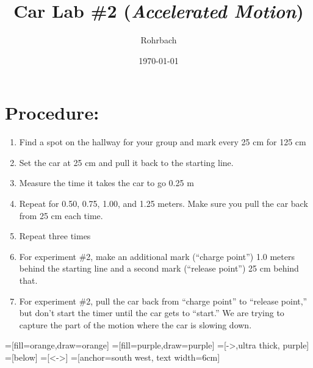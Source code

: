 \documentclass[10pt]{exam}
\title{Car Lab \#2 (\emph{Accelerated Motion})}
\author{Rohrbach}
\date{\today}
\begin{document}
\maketitle

\vspace{-1em}
\section*{Procedure:}
  \begin{enumerate}[label=\alph*),topsep=0pt,itemsep=-1ex,partopsep=1ex,parsep=1ex]
    \item 
      Find a spot on the hallway for your group and mark every 25 cm for 125 cm
    \item 
      Set the car at 25 cm and pull it back to the starting line.
    \item 
      Measure the time it takes the car to go 0.25 m
    \item
      Repeat for 0.50, 0.75, 1.00, and 1.25 meters.  Make sure you pull the car back from 25 cm each time.
    \item
      Repeat three times
    \item 
      For experiment \#2, make an additional mark (``charge point'') 1.0 meters behind the starting line and a second mark (``release point'') 25 cm behind that.
    \item 
      For experiment \#2, pull the car back from ``charge point'' to ``release point,'' but don't start the timer until the car gets to ``start.''  We are trying to capture the part of the motion where the car is slowing down.
  \end{enumerate}

  =[fill=orange,draw=orange]
  =[fill=purple,draw=purple]
  =[->,ultra thick, purple]
  =[below]
  =[<->]
  =[anchor=south west, text width=6cm]
  \def\markwidth{.02}
  \def\abovesp{0.3}
  \tikzset{x=5cm}
\end{document}
